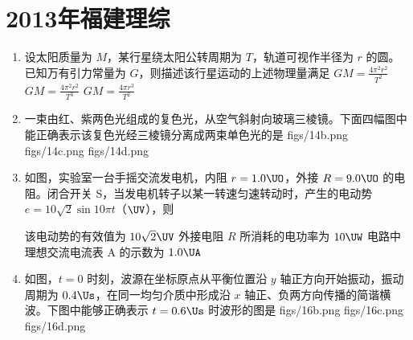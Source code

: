 \documentclass[\gkver]{gaokaozhenti}
\begin{document}
\chapter{2013年福建理综}

\begin{enumerate}
\item
设太阳质量为 $M$，某行星绕太阳公转周期为 $T$，轨道可视作半径为 $r$ 的圆。已知万有引力常量为 $G$，则描述该行星运动的上述物理量满足
{$GM=\frac{4\pi^{2}r^{2}}{T^{2}}$}
{$GM=\frac{4\pi^{2}r^{2}}{T^{3}}$}
{$GM=\frac{4\pi r^{3}}{T^{2}}$}

\item
一束由红、紫两色光组成的复色光，从空气斜射向玻璃三棱镜。下面四幅图中能正确表示该复色光经三棱镜分离成两束单色光的是
{figs/14b.png}
{figs/14c.png}
{figs/14d.png}

\item
如图，实验室一台手摇交流发电机，内阻 $r=1.0\UO$，外接 $R=9.0\UO$ 的电阻。闭合开关 S，当发电机转子以某一转速匀速转动时，产生的电动势 $e=10\sqrt{2}\sin 10\pi t$（$\UV$），则


{该电动势的有效值为 $10\sqrt{2}\UV$}
{外接电阻 $R$ 所消耗的电功率为 $10\UW$}
{电路中理想交流电流表 A 的示数为 $1.0\UA$}

\item
如图，$t=0$ 时刻，波源在坐标原点从平衡位置沿 $y$ 轴正方向开始振动，振动周期为 $0.4\Us$，在同一均匀介质中形成沿 $x$ 轴正、负两方向传播的简谐横波。下图中能够正确表示 $t=0.6\Us$ 时波形的图是
{figs/16b.png}
{figs/16c.png}
{figs/16d.png}


\end{enumerate}
\end{document}
